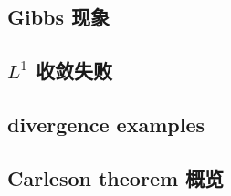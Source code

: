 

\subsection{Gibbs 现象}
\label{b2:subsec:020701}

\subsection{\texorpdfstring{\(L^1\)}{L1} 收敛失败}
\label{b2:subsec:020702}

\subsection{divergence examples}
\label{b2:subsec:020703}

\subsection{Carleson theorem 概览}
\label{b2:subsec:020704}


